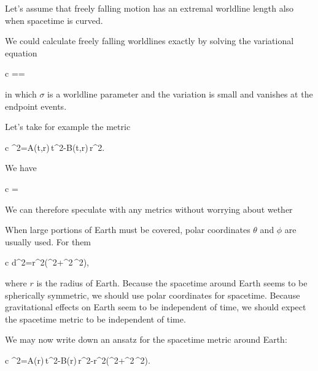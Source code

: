 \documentclass[11pt,oneside%
]{memoir}
\newenvironment{eqna}{\begin{IEEEeqnarray*}{c}}{\end{IEEEeqnarray*}\ignorespacesafterend}
\newcommand{\der}[2]{\frac{\dd#1}{\dd#2}}
\newcommand{\dd}{\mathrm{d}}
\begin{document}



Let's assume that freely falling motion has an extremal worldline length also when spacetime is curved. 

We could calculate freely falling worldlines exactly by solving the variational equation
\begin{eqna}
\delta\tau=\delta\int\dd\tau=\int\delta\,\der{\tau}{\sigma}\,\dd{}
\end{eqna}
in which \(\sigma\) is a worldline parameter and the variation is small and vanishes at the endpoint events.

Let's take for example the metric
\begin{eqna}
\dd\tau^2=A(t,r)\,\dd t^2-B(t,r)\,\dd r^2.
\end{eqna}
We have
\begin{eqna}
\delta\tau=\int\delta\dd\tau
\end{eqna}

We can therefore speculate with any metrics without worrying about wether 

When large portions of Earth must be covered, polar coordinates \(\theta\) and \(\phi\) are usually used. For them
\begin{eqna}
\dd d^2=r^2\left(\dd\theta^2+\sin^2\theta\,\dd\phi^2\right),
\end{eqna}
where \(r\) is the radius of Earth. Because the spacetime around Earth seems to be spherically symmetric, we should use polar coordinates for spacetime. Because gravitational effects on Earth seem to be independent of time, we should expect the spacetime metric to be independent of time.

We may now write down an ansatz for the spacetime metric around Earth:
\begin{eqna}
\dd\tau^2=A(r)\,\dd t^2-B(r)\,\dd r^2-r^2\left(\dd\theta^2+\sin^2\theta\,\dd\phi^2\right).
\end{eqna}


%
\end{document}

